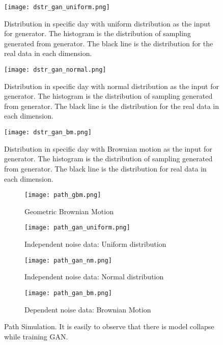 \documentclass{article}
\begin{document}
	
	
	\begin{figure}[h]
		\texttt{[image: dstr\_gan\_uniform.png]}
		\caption{Distribution in specific day with uniform distribution as the input for generator. The histogram is the distribution of sampling generated from generator. The black line is the distribution for the real data in each dimension.}
		\label{fig:dstr_gan_uniform}
	\end{figure}
	
	\begin{figure}[h]
		\texttt{[image: dstr\_gan\_normal.png]}
		\caption{Distribution in specific day with normal distribution as the input for generator. The histogram is the distribution of sampling generated from generator. The black line is the distribution for the real data in each dimension.}
		\label{fig:dstr_gan_normal}
	\end{figure}
	
	\begin{figure} [h]
		\texttt{[image: dstr\_gan\_bm.png]}
		\caption{Distribution in specific day with Brownian motion as the input for generator. The histogram is the distribution of sampling generated from generator. The black line is the distribution for real data in each dimension.}
		\label{fig:dstr_gan_brownian}
	\end{figure}
	
	
	\begin{figure}[h]
		\begin{subfigure}[b]{0.5\textwidth}
			\texttt{[image: path\_gbm.png]}
			\caption{Geometric Brownian Motion}
		\end{subfigure}
		\begin{subfigure}[b]{0.5\textwidth}
			\texttt{[image: path\_gan\_uniform.png]}
			\caption{Independent noise data: Uniform distribution}
		\end{subfigure}
		\begin{subfigure}[b]{0.5\textwidth}
			\texttt{[image: path\_gan\_nm.png]}
			\caption{Independent noise data: Normal distribution}
		\end{subfigure}
		\begin{subfigure}[b]{0.5\textwidth}
			\texttt{[image: path\_gan\_bm.png]}
			\caption{Dependent noise data: Brownian Motion}
		\end{subfigure}
		\caption{Path Simulation. It is easily to observe that there is model collapse while training GAN.}
		\label{fig:path_gan}
	\end{figure}
\end{document}
